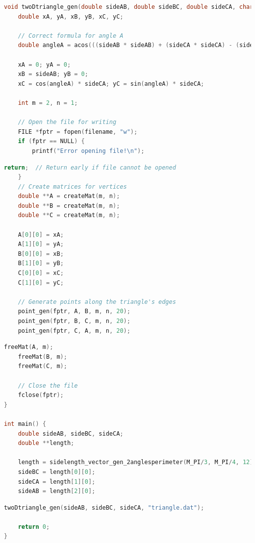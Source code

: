 \documentclass{beamer}
\theoremstyle{remark}
\numberwithin{equation}{section}
\begin{document}
\begin{frame}[fragile]
\begin{lstlisting}[language=C]
void twoDtriangle_gen(double sideAB, double sideBC, double sideCA, char filename[]) {
    double xA, yA, xB, yB, xC, yC;

    // Correct formula for angle A
    double angleA = acos(((sideAB * sideAB) + (sideCA * sideCA) - (sideBC * sideBC)) / (2 * sideAB * sideCA));

    xA = 0; yA = 0;
    xB = sideAB; yB = 0;
    xC = cos(angleA) * sideCA; yC = sin(angleA) * sideCA;

    int m = 2, n = 1;

    // Open the file for writing
    FILE *fptr = fopen(filename, "w");
    if (fptr == NULL) {
        printf("Error opening file!\n");
\end{lstlisting}
\end{frame}
\begin{frame}[fragile]
\begin{lstlisting}[language=C]
        return;  // Return early if file cannot be opened
    }
    // Create matrices for vertices
    double **A = createMat(m, n);
    double **B = createMat(m, n);
    double **C = createMat(m, n);

    A[0][0] = xA;
    A[1][0] = yA;
    B[0][0] = xB;
    B[1][0] = yB;
    C[0][0] = xC;
    C[1][0] = yC;

    // Generate points along the triangle's edges
    point_gen(fptr, A, B, m, n, 20);
    point_gen(fptr, B, C, m, n, 20);
    point_gen(fptr, C, A, m, n, 20);
\end{lstlisting}
\end{frame}
\begin{frame}[fragile]
\begin{lstlisting}[language=C]
    freeMat(A, m);
    freeMat(B, m);
    freeMat(C, m);

    // Close the file
    fclose(fptr);
}

int main() {
    double sideAB, sideBC, sideCA;
    double **length;
    
    length = sidelength_vector_gen_2anglesperimeter(M_PI/3, M_PI/4, 12);
    sideBC = length[0][0];
    sideCA = length[1][0];
    sideAB = length[2][0];
\end{lstlisting}
\end{frame}
\begin{frame}[fragile]
\begin{lstlisting}[language=C]
    twoDtriangle_gen(sideAB, sideBC, sideCA, "triangle.dat");
    
    return 0;
}
    \end{lstlisting}
\end{frame}
\end{document}
